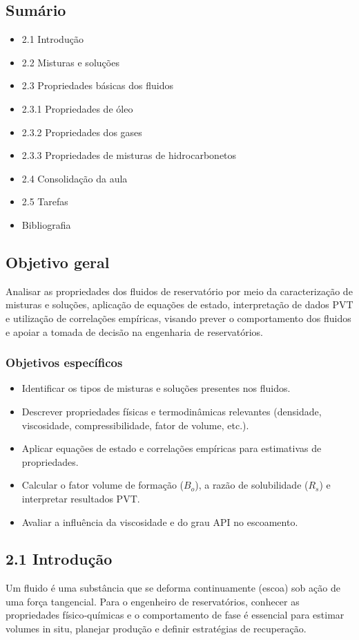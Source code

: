 \documentclass[11pt,a4paper]{article}
\begin{document}
\subsection{Sumário}
\begin{itemize}
\item 2.1 Introdução
\item 2.2 Misturas e soluções
\item 2.3 Propriedades básicas dos fluidos
\item 2.3.1 Propriedades de óleo
\item 2.3.2 Propriedades dos gases
\item 2.3.3 Propriedades de misturas de hidrocarbonetos
\item 2.4 Consolidação da aula
\item 2.5 Tarefas
\item Bibliografia
\end{itemize}


\subsection{Objetivo geral}
Analisar as propriedades dos fluidos de reservatório por meio da caracterização de misturas e soluções, aplicação de equações de estado, interpretação de dados PVT e utilização de correlações empíricas, visando prever o comportamento dos fluidos e apoiar a tomada de decisão na engenharia de reservatórios.

\subsubsection{Objetivos específicos}
\begin{itemize}
\item Identificar os tipos de misturas e soluções presentes nos fluidos.
\item Descrever propriedades físicas e termodinâmicas relevantes (densidade, viscosidade, compressibilidade, fator de volume, etc.).
\item Aplicar equações de estado e correlações empíricas para estimativas de propriedades.
\item Calcular o fator volume de formação ($B_o$), a razão de solubilidade ($R_s$) e interpretar resultados PVT.
\item Avaliar a influência da viscosidade e do grau API no escoamento.
\end{itemize}

\subsection{2.1 Introdução}
Um fluido é uma substância que se deforma continuamente (escoa) sob ação de uma força tangencial. Para o engenheiro de reservatórios, conhecer as propriedades físico‑químicas e o comportamento de fase é essencial para estimar volumes in situ, planejar produção e definir estratégias de recuperação.
\end{document}
